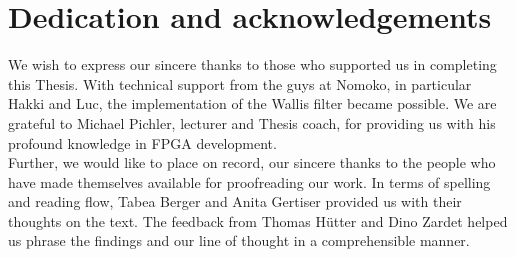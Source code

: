 
\chapter*{Dedication and acknowledgements}
\begin{SingleSpace}





We wish to express our sincere thanks to those who supported us in completing
this Thesis. With technical support from the guys at Nomoko, in particular Hakki
and
Luc, the implementation of the Wallis filter became possible. We are
grateful to Michael Pichler, lecturer and Thesis coach, for providing us with
his profound knowledge in FPGA development. 
\\

Further, we would like to place on record, our sincere thanks to the people who
have made themselves available for proofreading our work. In terms of spelling
and reading flow, Tabea Berger and Anita Gertiser provided us with their
thoughts on the text. The feedback from Thomas H\"utter and Dino Zardet helped
us phrase the findings and our line of thought in a comprehensible manner.


%
%
%

 \end{SingleSpace} \clearpage
